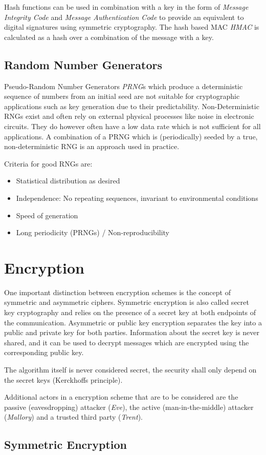 Hash functions can be used in combination with a key in the form of
\emph{Message Integrity Code} and \emph{Message Authentication Code} to provide
an equivalent to digital signatures using symmetric cryptography. The hash based
MAC \emph{HMAC} is calculated as a hash over a combination of the message with a
key.

\subsection{Random Number Generators}
Pseudo-Random Number Generators \emph{PRNG}s which produce a deterministic
sequence of numbers from an initial seed are not suitable for cryptographic
applications such as key generation due to their predictability.
Non-Deterministic RNGs exist and often rely on external physical processes like
noise in electronic circuits. They do however often have a low data rate which
is not sufficient for all applications. A combination of a PRNG which is
(periodically) seeded by a true, non-deterministic RNG is an approach used in
practice.

Criteria for good RNGs are:
\begin{itemize}
    \item Statistical distribution as desired
    \item Independence: No repeating sequences, invariant to environmental
          conditions
    \item Speed of generation
    \item Long periodicity (PRNGs) / Non-reproducibility
\end{itemize}


\section{Encryption}
One important distinction between encryption schemes is the concept of symmetric
and asymmetric ciphers. Symmetric encryption is also called secret key
cryptography and relies on the presence of a secret key at both endpoints of the
communication. Asymmetric or public key encryption separates the key into a
public and private key for both parties. Information about the secret key is
never shared, and it can be used to decrypt messages which are encrypted using
the corresponding public key.

The algorithm itself is never considered secret, the security shall only depend
on the secret keys (Kerckhoffs principle).

Additional actors in a encryption scheme that are to be considered are the
passive (eavesdropping) attacker (\textit{Eve}), the active (man-in-the-middle)
attacker (\textit{Mallory}) and a trusted third party (\textit{Trent}).

\subsection{Symmetric Encryption}

